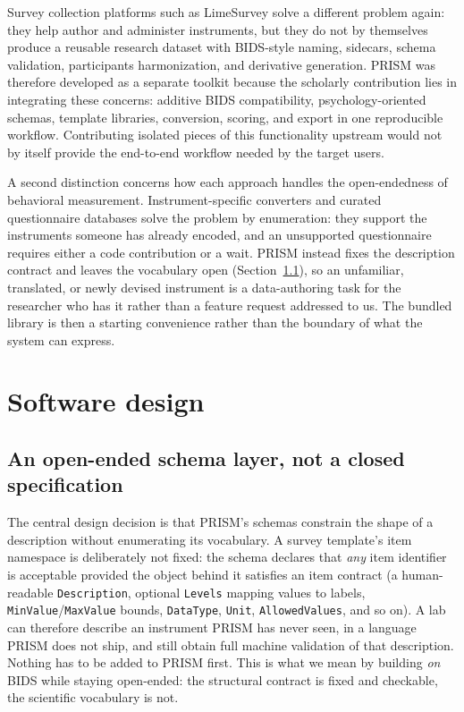 \documentclass[10pt]{article}
\begin{document}
Survey collection platforms such as LimeSurvey solve a different problem
again: they help author and administer instruments, but they do not by
themselves produce a reusable research dataset with BIDS-style naming,
sidecars, schema validation, participants harmonization, and derivative
generation. PRISM was therefore developed as a separate toolkit because the
scholarly contribution lies in integrating these concerns: additive BIDS
compatibility, psychology-oriented schemas, template libraries, conversion,
scoring, and export in one reproducible workflow. Contributing isolated
pieces of this functionality upstream would not by itself provide the
end-to-end workflow needed by the target users.

A second distinction concerns how each approach handles the open-endedness
of behavioral measurement. Instrument-specific converters and curated
questionnaire databases solve the problem by enumeration: they support the
instruments someone has already encoded, and an unsupported questionnaire
requires either a code contribution or a wait. PRISM instead fixes the
description contract and leaves the vocabulary open
(Section~\ref{sec:openended}), so an unfamiliar, translated, or newly
devised instrument is a data-authoring task for the researcher who has it
rather than a feature request addressed to us. The bundled library is then a
starting convenience rather than the boundary of what the system can
express.

\section{Software design}

\subsection{An open-ended schema layer, not a closed specification}
\label{sec:openended}

The central design decision is that PRISM's schemas constrain the shape of a
description without enumerating its vocabulary. A survey template's item
namespace is deliberately not fixed: the schema declares that \emph{any}
item identifier is acceptable provided the object behind it satisfies an
item contract (a human-readable \texttt{Description}, optional
\texttt{Levels} mapping values to labels, \texttt{MinValue}/\texttt{MaxValue}
bounds, \texttt{DataType}, \texttt{Unit}, \texttt{AllowedValues}, and so on).
A lab can therefore describe an instrument PRISM has never seen, in a
language PRISM does not ship, and still obtain full machine validation of
that description. Nothing has to be added to PRISM first. This is what we
mean by building \emph{on} BIDS while staying open-ended: the structural
contract is fixed and checkable, the scientific vocabulary is not.
\end{document}
